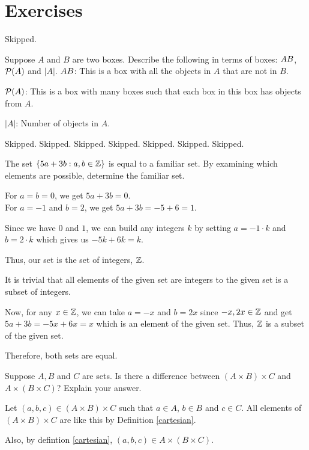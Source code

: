 \section*{Exercises}


\bp Skipped.\ep

\bp
Suppose $A$ and $B$ are two boxes. Describe the following in terms of boxes: $A \\ B$, $\mathcal{P}(A)$ and $|A|$.
\ep
\bs
$A \\ B$: This is a box with all the objects in $A$ that are not in $B$.

$\mathcal{P}(A)$: This is a box with many boxes such that each box in this box has objects from $A$.

$|A|$: Number of objects in $A$.
\es


\bp Skipped.\ep
\bp Skipped.\ep
\bp Skipped.\ep
\bp Skipped.\ep
\bp Skipped.\ep
\bp Skipped.\ep
\bp Skipped.\ep

\bp
The set $\{5a+3b: a, b \in \mathbb{Z}\}$ is equal to a familiar set. By examining which elements are possible, determine the familiar set.
\ep

\bs
For $a = b = 0$, we get $5a + 3b = 0$. \\
For $a = -1$ and $b = 2$, we get $5a + 3b = -5+6 = 1$.

Since we have $0$ and $1$, we can build any integers $k$ by setting $a = -1 \cdot k$ and $b = 2 \cdot k$ which gives us $-5k+6k = k$.

Thus, our set is the set of integers, $\mathbb{Z}$.

It is trivial that all elements of the given set are integers to the given set is a subset of integers.

Now, for any $x \in \mathbb{Z}$, we can take $a = -x$ and $b = 2x$ since $-x, 2x \in \mathbb{Z}$ and get $5a + 3b = -5x + 6x = x$ which is an element of the given set.
Thus, $\mathbb{Z}$ is a subset of the given set.

Therefore, both sets are equal.

\es

\bp
Suppose $A, B$ and $C$ are sets. Is there a difference between $(A \times B) \times C$ and $A \times (B \times C)$? Explain your answer.
\ep

\bs
Let $(a, b, c) \in (A \times B) \times C$ such that $a \in A$, $b \in B$ and $c \in C$. All elements of $(A \times B) \times C$ are like this by Definition \ref{cartesian}.

Also, by defintion \ref{cartesian}, $(a, b, c) \in A \times (B \times C)$.

